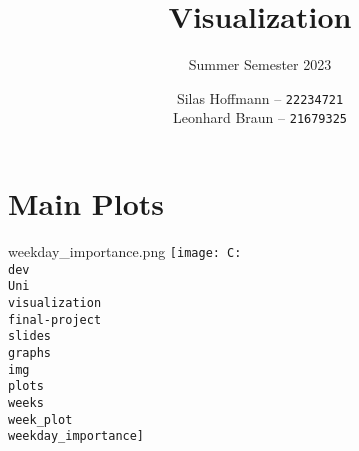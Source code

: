 \documentclass[pdf]{beamer}
\title{Visualization}
\subtitle{Summer Semester 2023}
\author{
    Silas Hoffmann --
    \texttt{22234721} \\
    Leonhard Braun --
    \texttt{21679325} \\
}
\institute{Georg-August-Universität Göttingen}
\begin{document}
\maketitle

\section{Main Plots}
\begin{frame}{weekday\_importance.png}
	\centering
	\texttt{[image: C:\\dev\\Uni\\visualization\\final-project\\slides\\graphs\\img\\plots\\weeks\\week\_plot\\weekday\_importance]}
\end{frame}
\end{document}
